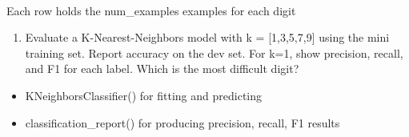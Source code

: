 \documentclass[11pt]{article}
\providecommand{\tightlist}{%
      \setlength{\itemsep}{0pt}\setlength{\parskip}{0pt}}
\begin{document}
    \begin{center}
    \end{center}
    { \hspace*{\fill} \\}
    
    Each row holds the num\_examples examples for each digit

    \begin{enumerate}
\def\labelenumi{(\arabic{enumi})}
\setcounter{enumi}{1}
\tightlist
\item
  Evaluate a K-Nearest-Neighbors model with k = {[}1,3,5,7,9{]} using
  the mini training set. Report accuracy on the dev set. For k=1, show
  precision, recall, and F1 for each label. Which is the most difficult
  digit?
\end{enumerate}

\begin{itemize}
\tightlist
\item
  KNeighborsClassifier() for fitting and predicting
\item
  classification\_report() for producing precision, recall, F1 results
\end{itemize}
\end{document}
